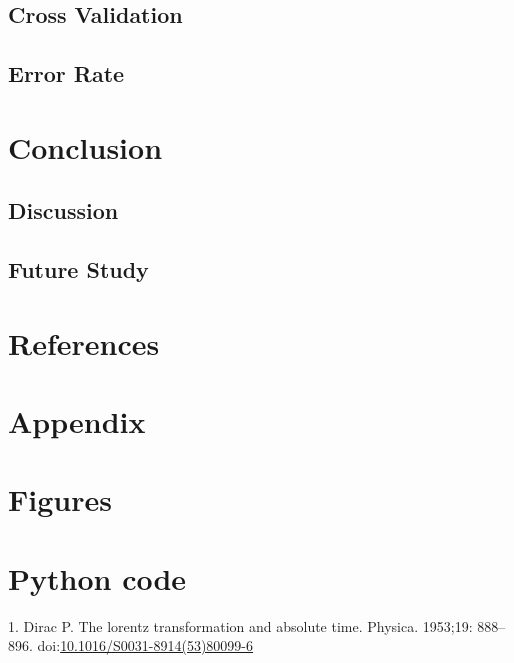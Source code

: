 \documentclass[10pt,letterpaper]{article}
\begin{document}
\subsection{Cross Validation}\label{cross-validation}

\subsection{Error Rate}\label{error-rate}

\section{Conclusion}\label{conclusion}

\subsection{Discussion}\label{discussion}

\subsection{Future Study}\label{future-study}

\section*{References}\label{references}

\section{Appendix}\label{appendix}

\section{Figures}\label{figures}

\section*{Python code}\label{python-code}

\hypertarget{refs}{}
\hypertarget{ref-Dirac1953888}{}
1. Dirac P. The lorentz transformation and absolute time. Physica.
1953;19: 888--896.
doi:\href{https://doi.org/10.1016/S0031-8914(53)80099-6}{10.1016/S0031-8914(53)80099-6}

\nolinenumbers
\end{document}
